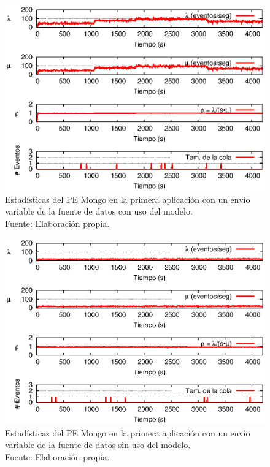 \begin{figure}[!ht]
    \centering
    \captionsetup{justification=centering}
    \includegraphics[scale=1]{images/exp/app1/normal/cm/statusMongoPE.eps}
    \caption[Estad\'isticas del PE Mongo en la primera aplicaci\'on con un env\'io variable de la fuente de datos con uso del modelo.]{Estad\'isticas del PE Mongo en la primera aplicaci\'on con un env\'io variable de la fuente de datos con uso del modelo.\\Fuente: Elaboraci\'on propia.}
    \label{fig:app1-normal-statusMongoPE-cm}
\end{figure}

\begin{figure}[!ht]
    \centering
    \captionsetup{justification=centering}
    \includegraphics[scale=1]{images/exp/app1/normal/sm/statusMongoPE.eps}
    \caption[Estad\'isticas del PE Mongo en la primera aplicaci\'on con un env\'io variable de la fuente de datos sin uso del modelo.]{Estad\'isticas del PE Mongo en la primera aplicaci\'on con un env\'io variable de la fuente de datos sin uso del modelo.\\Fuente: Elaboraci\'on propia.}
    \label{fig:app1-normal-statusMongoPE-sm}
\end{figure}

